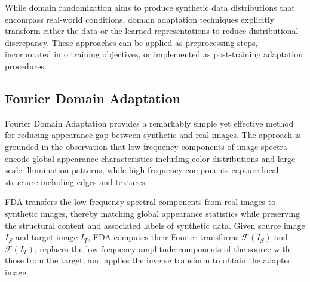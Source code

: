 While domain randomization aims to produce synthetic data distributions that encompass real-world conditions, domain adaptation techniques explicitly transform either the data or the learned representations to reduce distributional discrepancy. These approaches can be applied as preprocessing steps, incorporated into training objectives, or implemented as post-training adaptation procedures.

\subsection{Fourier Domain Adaptation}

Fourier Domain Adaptation provides a remarkably simple yet effective method for reducing appearance gap between synthetic and real images. The approach is grounded in the observation that low-frequency components of image spectra encode global appearance characteristics including color distributions and large-scale illumination patterns, while high-frequency components capture local structure including edges and textures.

FDA transfers the low-frequency spectral components from real images to synthetic images, thereby matching global appearance statistics while preserving the structural content and associated labels of synthetic data. Given source image $I_S$ and target image $I_T$, FDA computes their Fourier transforms $\mathcal{F}(I_S)$ and $\mathcal{F}(I_T)$, replaces the low-frequency amplitude components of the source with those from the target, and applies the inverse transform to obtain the adapted image.

